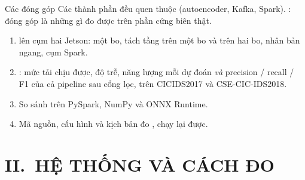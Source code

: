 \documentclass[aspectratio=169, 11pt]{beamer}
\begin{document}
\begin{frame}{Các đóng góp}
  \small Các thành phần đều quen thuộc (autoencoder, Kafka, Spark). : đóng góp là những gì đo được trên phần cứng biên thật.
  \vspace{0.3em}
  \begin{enumerate}
    \setlength{\itemsep}{0.3em}
    \item {} lên cụm hai Jetson: một bo, tách tầng
          trên một bo và trên hai bo, nhân bản ngang, cụm Spark.
    \item {}: mức tải chịu được, độ trễ, năng lượng mỗi dự đoán
          \emph{và} precision / recall / F1 của cả pipeline sau cổng lọc, trên
          CICIDS2017 và CSE-CIC-IDS2018.
    \item So sánh  trên PySpark, NumPy và ONNX Runtime.
    \item Mã nguồn, cấu hình và kịch bản đo , chạy lại được.
  \end{enumerate}
\end{frame}

\section{II.\ HỆ THỐNG VÀ CÁCH ĐO}
\end{document}

